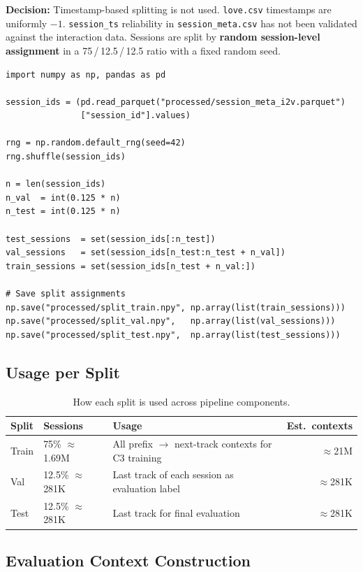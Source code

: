 \documentclass[11pt]{article}
\newcommand{\decision}[1]{\textcolor{decisionblue}{\textbf{Decision:} #1}}
\begin{document}
\decision{Timestamp-based splitting is not used.
\texttt{love.csv} timestamps are uniformly $-1$.
\texttt{session\_ts} reliability in \texttt{session\_meta.csv} has not
been validated against the interaction data.
Sessions are split by \textbf{random session-level assignment}
in a 75\,/\,12.5\,/\,12.5 ratio with a fixed random seed.}

\begin{lstlisting}
import numpy as np, pandas as pd

session_ids = (pd.read_parquet("processed/session_meta_i2v.parquet")
               ["session_id"].values)

rng = np.random.default_rng(seed=42)
rng.shuffle(session_ids)

n = len(session_ids)
n_val  = int(0.125 * n)
n_test = int(0.125 * n)

test_sessions  = set(session_ids[:n_test])
val_sessions   = set(session_ids[n_test:n_test + n_val])
train_sessions = set(session_ids[n_test + n_val:])

# Save split assignments
np.save("processed/split_train.npy", np.array(list(train_sessions)))
np.save("processed/split_val.npy",   np.array(list(val_sessions)))
np.save("processed/split_test.npy",  np.array(list(test_sessions)))
\end{lstlisting}

\subsection{Usage per Split}

\begin{table}[H]
\centering
\caption{How each split is used across pipeline components.}
\begin{tabular}{lllr}
\toprule
\textbf{Split} & \textbf{Sessions} & \textbf{Usage} & \textbf{Est.\ contexts} \\
\midrule
Train & 75\% $\approx$ 1.69M &
  All prefix $\to$ next-track contexts for C3 training &
  $\approx$21M \\
Val & 12.5\% $\approx$ 281K &
  Last track of each session as evaluation label &
  $\approx$281K \\
Test & 12.5\% $\approx$ 281K &
  Last track for final evaluation &
  $\approx$281K \\
\bottomrule
\end{tabular}
\end{table}

\subsection{Evaluation Context Construction}
\end{document}
